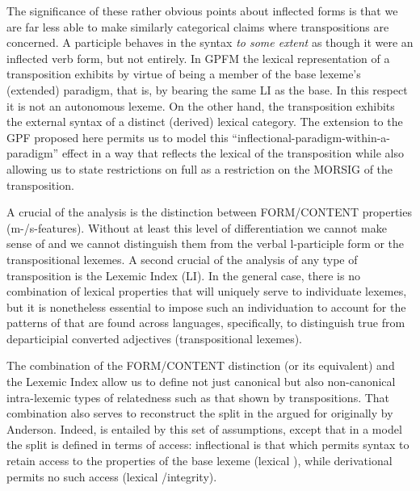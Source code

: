 \documentclass[output=paper,
modfonts
]{LSP/langsci}
\begin{document}
The significance of these rather obvious points about inflected forms is that we are far less able to make similarly categorical claims where transpositions are concerned. A participle behaves in the syntax \emph{to some extent} as though it were an inflected verb form, but not entirely. In GPFM the lexical representation of a transposition exhibits  by virtue of being a member of the base lexeme’s (extended) paradigm, that is, by bearing the same LI as the base. In this respect it is not an autonomous lexeme. On the other hand, the transposition exhibits the external syntax of a distinct (derived) lexical category. The extension to the GPF proposed here permits us to model this ``inflectional-paradigm-within-a-paradigm'' effect in a way that reflects the lexical  of the transposition while also allowing us to state restrictions on full  as a restriction on the MORSIG of the transposition. 

A crucial  of the analysis is the distinction between FORM/CONTENT properties (m-/s-features). %
Without at  least this level of differentiation we cannot make sense of   and we cannot distinguish them from the verbal l-participle form or the transpositional lexemes.  A second crucial  of the analysis of any type of transposition is the Lexemic Index (LI). In the general case, there is no combination of lexical properties that will uniquely serve to individuate lexemes, but it is nonetheless essential to impose such an individuation to account for the patterns of  that are found across languages, specifically, to distinguish true  from departicipial converted adjectives (transpositional lexemes). 

The combination of the FORM/CONTENT  distinction (or its equivalent) and the Lexemic Index allow us to define not just canonical  but also non-canonical intra-lexemic types of relatedness such as that shown by transpositions. That combination also serves to reconstruct the split in the  argued for originally by Anderson. Indeed,  is entailed by this set of assumptions, except that in a  model the split is defined in terms of access: inflectional  is that which permits syntax to retain access to the properties of the base lexeme (lexical ), while derivational  permits no such access (lexical /integrity).   
\end{document}
